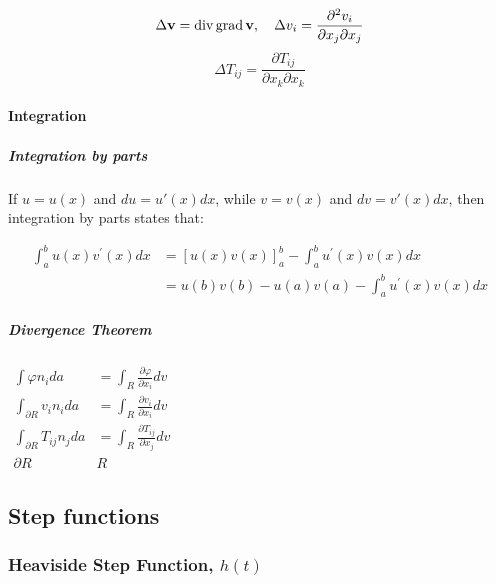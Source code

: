 \[\Delta \mathbf{v}=\operatorname{div} \operatorname{grad} \mathbf{v}, \quad \Delta v_{i}=\frac{\partial^{2} v_{i}}{\partial x_{j} \partial x_{j}}\\\]
\[\Delta T_{i j}=\frac{\partial T_{i j}}{\partial x_{k} \partial x_{k}}\]

\hypertarget{integration}{%
\paragraph{Integration}\label{integration}}

\hypertarget{integration-by-parts}{%
\subparagraph{Integration by parts}\label{integration-by-parts}}

If \(u = u(x)\) and \(du = u'(x) dx\), while \(v = v(x)\) and
\(dv = v'(x) dx\), then integration by parts states that:

\[\begin{aligned}
\int_{a}^{b} u(x) v^{\prime}(x) d x &=[u(x) v(x)]_{a}^{b}-\int_{a}^{b} u^{\prime}(x) v(x) d x \\
&=u(b) v(b)-u(a) v(a)-\int_{a}^{b} u^{\prime}(x) v(x) d x
\end{aligned}\]

\hypertarget{divergence-theorem}{%
\subparagraph{Divergence Theorem}\label{divergence-theorem}}

\(\begin{array}{rl}{\int \varphi n_{i} d a} & {=\int_{R} \frac{\partial \varphi}{\partial x_{i}} d v} \\ {\int_{\partial R} v_{i} n_{i} d a} & {=\int_{R} \frac{\partial v_{i}}{\partial x_{i}} d v} \\ {\int_{\partial R} T_{i j} n_{j} d a} & {=\int_{R} \frac{\partial T_{i j}}{\partial x_{j}} d v} \\ {\partial R} & {R}\end{array}\)

\hypertarget{step-functions}{%
\subsection{Step functions}\label{step-functions}}

\hypertarget{heaviside-step-function-ht}{%
\subsubsection{\texorpdfstring{Heaviside Step Function,
\(h(t)\)}{Heaviside Step Function, h(t)}}\label{heaviside-step-function-ht}}

